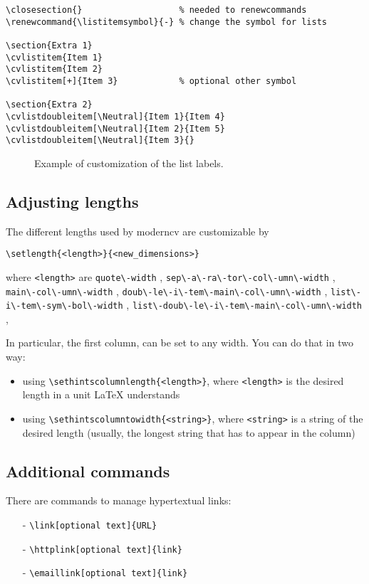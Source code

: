 \documentclass[a4paper,11pt]{article}
\newcommand{\Code}[1]{\lstinline!#1! } %
\begin{document}
\begin{verbatim}
\closesection{}                   % needed to renewcommands
\renewcommand{\listitemsymbol}{-} % change the symbol for lists

\section{Extra 1}
\cvlistitem{Item 1}
\cvlistitem{Item 2}
\cvlistitem[+]{Item 3}            % optional other symbol

\section{Extra 2}
\cvlistdoubleitem[\Neutral]{Item 1}{Item 4}
\cvlistdoubleitem[\Neutral]{Item 2}{Item 5}
\cvlistdoubleitem[\Neutral]{Item 3}{}
\end{verbatim} 

\begin{figure}[!hbt]
 \centering
 \caption{Example of customization of the list labels.}
 \label{fig:ex_items}
\end{figure}

\subsection*{Adjusting lengths}
The different lengths used by moderncv are customizable by
\begin{verbatim}
\setlength{<length>}{<new_dimensions>}
\end{verbatim}
where \Code{<length>} are \Code{quote\-width}, \Code{sep\-a\-ra\-tor\-col\-umn\-width}, \Code{main\-col\-umn\-width}, \Code{doub\-le\-i\-tem\-main\-col\-umn\-width}, \Code{list\-i\-tem\-sym\-bol\-width}, \Code{list\-doub\-le\-i\-tem\-main\-col\-umn\-width}, 

In particular, the first column, can be set to any width. You can do that in two way:
\begin{itemize}
 \item using \verb|\sethintscolumnlength{<length>}|, where  \Code{<length>} is the desired length in a unit LaTeX understands
 \item using \verb|\sethintscolumntowidth{<string>}|, where \Code{<string>} is a string of the desired length (usually, the longest string that has to appear in the column)
\end{itemize}

\subsection*{Additional commands}
There are commands to manage hypertextual links:
\begin{itemize}
 \item[-] \verb|\link[optional text]{URL}|
 \item[-] \verb|\httplink[optional text]{link}|
 \item[-] \verb|\emaillink[optional text]{link}|
\end{itemize}
\end{document}
